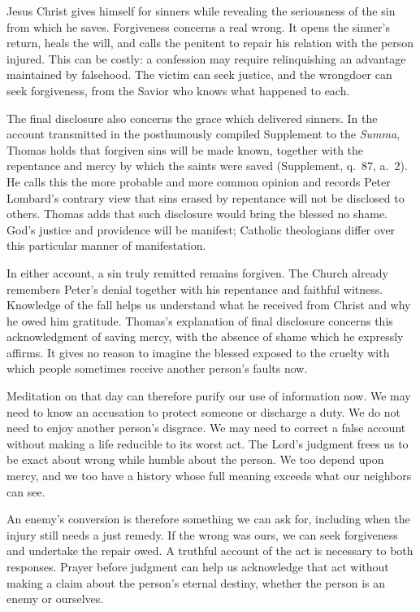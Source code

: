 Jesus Christ gives himself for sinners while revealing the seriousness of the sin from which he saves. Forgiveness concerns a real wrong. It opens the sinner's return, heals the will, and calls the penitent to repair his relation with the person injured. This can be costly: a confession may require relinquishing an advantage maintained by falsehood. The victim can seek justice, and the wrongdoer can seek forgiveness, from the Savior who knows what happened to each.

The final disclosure also concerns the grace which delivered sinners. In the account transmitted in the posthumously compiled Supplement to the \emph{Summa}, Thomas holds that forgiven sins will be made known, together with the repentance and mercy by which the saints were saved (Supplement, q.~87, a.~2). He calls this the more probable and more common opinion and records Peter Lombard's contrary view that sins erased by repentance will not be disclosed to others. Thomas adds that such disclosure would bring the blessed no shame. God's justice and providence will be manifest; Catholic theologians differ over this particular manner of manifestation.

In either account, a sin truly remitted remains forgiven. The Church already remembers Peter's denial together with his repentance and faithful witness. Knowledge of the fall helps us understand what he received from Christ and why he owed him gratitude. Thomas's explanation of final disclosure concerns this acknowledgment of saving mercy, with the absence of shame which he expressly affirms. It gives no reason to imagine the blessed exposed to the cruelty with which people sometimes receive another person's faults now.

Meditation on that day can therefore purify our use of information now. We may need to know an accusation to protect someone or discharge a duty. We do not need to enjoy another person's disgrace. We may need to correct a false account without making a life reducible to its worst act. The Lord's judgment frees us to be exact about wrong while humble about the person. We too depend upon mercy, and we too have a history whose full meaning exceeds what our neighbors can see.

An enemy's conversion is therefore something we can ask for, including when the injury still needs a just remedy. If the wrong was ours, we can seek forgiveness and undertake the repair owed. A truthful account of the act is necessary to both responses. Prayer before judgment can help us acknowledge that act without making a claim about the person's eternal destiny, whether the person is an enemy or ourselves.

